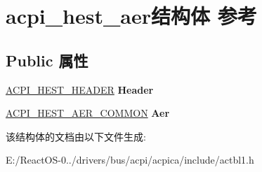\hypertarget{structacpi__hest__aer}{}\section{acpi\+\_\+hest\+\_\+aer结构体 参考}
\label{structacpi__hest__aer}
\subsection*{Public 属性}
\begin{DoxyCompactItemize}
\item 
\mbox{\label{structacpi__hest__aer_a5611664fadeb05c068e197e679813e70}} 
\hyperlink{structacpi__hest__header}{A\+C\+P\+I\+\_\+\+H\+E\+S\+T\+\_\+\+H\+E\+A\+D\+ER} {\bfseries Header}
\item 
\mbox{\label{structacpi__hest__aer_a653b696e9df8e4b40426ca2e25a1147a}} 
\hyperlink{structacpi__hest__aer__common}{A\+C\+P\+I\+\_\+\+H\+E\+S\+T\+\_\+\+A\+E\+R\+\_\+\+C\+O\+M\+M\+ON} {\bfseries Aer}
\end{DoxyCompactItemize}


该结构体的文档由以下文件生成\+:\begin{DoxyCompactItemize}
\item 
E\+:/\+React\+O\+S-\/0../drivers/bus/acpi/acpica/include/actbl1.\+h\end{DoxyCompactItemize}
